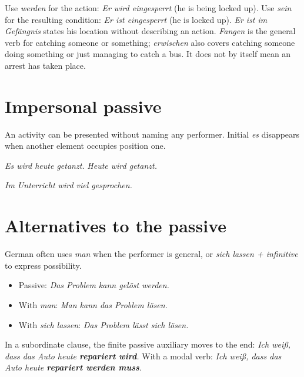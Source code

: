 Use \textit{werden} for the action: \textit{Er wird eingesperrt}
(he is being locked up). Use \textit{sein} for the resulting condition:
\textit{Er ist eingesperrt} (he is locked up).
\textit{Er ist im Gefängnis} states his location without describing an action.
\textit{Fangen} is the general verb for catching someone or something;
\textit{erwischen} also covers catching someone doing something or just
managing to catch a bus. It does not by itself mean an arrest has taken place.

\section{Impersonal passive}

An activity can be presented without naming any performer. Initial
\textit{es} disappears when another element occupies position one.

\begin{center}
\textit{Es wird heute getanzt.}
\qquad
\textit{Heute wird getanzt.}

\textit{Im Unterricht wird viel gesprochen.}
\end{center}

\section{Alternatives to the passive}

German often uses \textit{man} when the performer is general, or
\textit{sich lassen + infinitive} to express possibility.

\begin{itemize}[leftmargin=*]
  \item Passive: \textit{Das Problem kann gelöst werden.}
  \item With \textit{man}: \textit{Man kann das Problem lösen.}
  \item With \textit{sich lassen}: \textit{Das Problem lässt sich lösen.}
\end{itemize}

\begin{tcolorbox}[
  colback=referenceRedBg,
  colframe=genderFeminine,
  title={Word-order reminder},
  fonttitle=\bfseries
]
In a subordinate clause, the finite passive auxiliary moves to the end:
\textit{Ich weiß, dass das Auto heute \textbf{repariert wird}.}
With a modal verb: \textit{Ich weiß, dass das Auto heute
\textbf{repariert werden muss}.}
\end{tcolorbox}
